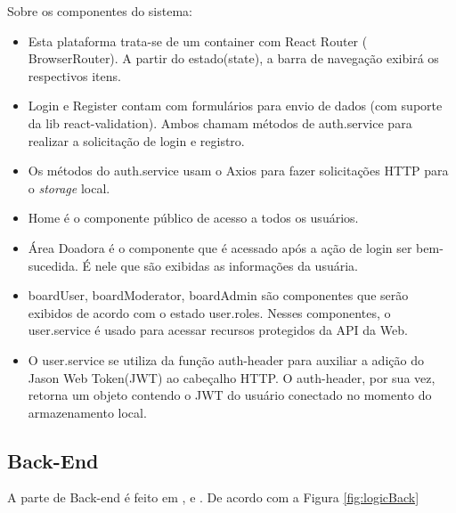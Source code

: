 Sobre os componentes do sistema:
\begin{itemize}
  \item Esta plataforma trata-se de um container com React Router ( BrowserRouter). A partir do estado(state), a barra de navegação exibirá os respectivos itens.
  \item  Login e Register contam com formulários para envio de dados (com suporte da lib react-validation). Ambos chamam métodos de auth.service para realizar a solicitação de login e registro.
  \item Os métodos do auth.service usam o Axios para fazer solicitações HTTP para o \textit{storage} local.
   \item Home é o componente público de acesso a todos os usuários.
   \item Área Doadora é o componente que é acessado após a ação de login ser bem-sucedida. É nele que são exibidas as informações da usuária.
   \item boardUser, boardModerator, boardAdmin são componentes que serão exibidos de acordo com o estado user.roles. Nesses componentes, o user.service é usado para acessar recursos protegidos da API da Web.
   \item O user.service se utiliza da função auth-header para auxiliar a adição do Jason Web Token(JWT) ao cabeçalho HTTP. O auth-header, por sua vez, retorna um objeto contendo o JWT do usuário conectado no momento do armazenamento local.
\end{itemize}
\clearpage

\subsection{Back-End}
A parte de Back-end é feito em \cite{Node.js}, \cite{Express} e \cite{Sequelize}. De acordo com a Figura \ref{fig:logicBack}

